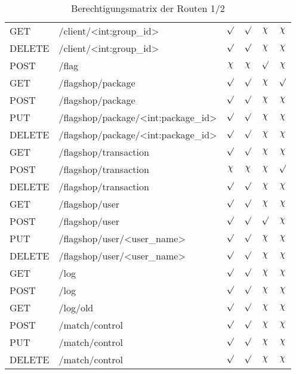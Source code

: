 \begin{table}
\begin{tabular}{l l c c c c}
		GET 	& /client/<int:group\_id>			& $\surd$ & $\surd$ & $\chi$ & $\chi$ \\
		DELETE	& /client/<int:group\_id>			& $\surd$ & $\surd$ & $\chi$ & $\chi$ \\
		POST 	& /flag								& $\chi$ & $\chi$ & $\surd$ & $\chi$ \\
		GET		& /flagshop/package					& $\surd$ & $\surd$ & $\chi$ & $\surd$ \\
		POST	& /flagshop/package					& $\surd$ & $\surd$ & $\chi$ & $\chi$ \\
		PUT 	&/flagshop/package/<int:package\_id>& $\surd$ & $\surd$ & $\chi$ & $\chi$ \\
		DELETE	&/flagshop/package/<int:package\_id>& $\surd$ & $\surd$ & $\chi$ & $\chi$ \\
		GET		& /flagshop/transaction				& $\surd$ & $\surd$ & $\chi$ & $\chi$ \\
		POST	& /flagshop/transaction				& $\chi$ & $\chi$ & $\chi$ & $\surd$ \\
		DELETE	& /flagshop/transaction				& $\surd$ & $\surd$ & $\chi$ & $\chi$ \\
		GET		& /flagshop/user					& $\surd$ & $\surd$ & $\chi$ & $\chi$ \\
		POST	& /flagshop/user					& $\surd$ & $\surd$ & $\surd$ & $\chi$ \\
		PUT		& /flagshop/user/<user\_name>		& $\surd$ & $\surd$ & $\chi$ & $\chi$ \\
		DELETE	& /flagshop/user/<user\_name>		& $\surd$ & $\surd$ & $\chi$ & $\chi$ \\
		GET 	& /log								& $\surd$ & $\surd$ & $\chi$ & $\chi$ \\
		POST 	& /log								& $\surd$ & $\surd$ & $\chi$ & $\chi$ \\
		GET		& /log/old							& $\surd$ & $\surd$ & $\chi$ & $\chi$ \\
		POST	& /match/control					& $\surd$ & $\surd$ & $\chi$ & $\chi$ \\
		PUT		& /match/control					& $\surd$ & $\surd$ & $\chi$ & $\chi$ \\
		DELETE	& /match/control					& $\surd$ & $\surd$ & $\chi$ & $\chi$ \\
	\end{tabular}
\caption{Berechtigungsmatrix der Routen 1/2}
\label{table:gis-permission-1}
\end{table}

